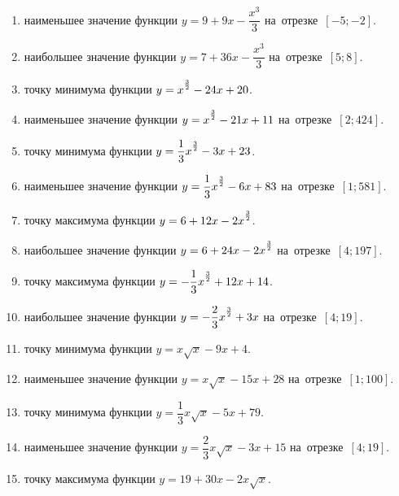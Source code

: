 \documentclass[a4paper,10pt]{article}
\begin{document}
\begin{enumerate}
\item {} наименьшее значение функции $y=9 +9x-\dfrac{x^3}{3}$ на~отрезке~$\left[-5;-2\right]$.

\item {} наибольшее значение функции $y=7 +36x-\dfrac{x^3}{3}$ на~отрезке~$\left[5;8\right]$.

\item {} точку минимума функции $y=x\strut^{\frac{3}{2}} -24x+20$.

\item {} наименьшее значение функции $y=x\strut^{\frac{3}{2}} -21x+11$ на~отрезке~$\left[2;424\right]$.

\item {} точку минимума функции $y=\dfrac{1}{3}x\strut^{\frac{3}{2}} -3x+23$.

\item {} наименьшее значение функции $y=\dfrac{1}{3}x\strut^{\frac{3}{2}} -6x+83$ на~отрезке~$\left[1;581\right]$.

\item {} точку максимума функции $y=6+12x-2x\strut^{\frac{3}{2}}$.

\item {} наибольшее значение функции $y=6+24x-2x\strut^{\frac{3}{2}}$ на~отрезке~$\left[4;197\right]$.

\item {} точку максимума функции $y=-\dfrac{1}{3}x\strut^{\frac{3}{2}} +12x+14$.

\item {} наибольшее значение функции $y=-\dfrac{2}{3}x\strut^{\frac{3}{2}} +3x$ на~отрезке~$\left[4;19\right]$.

\item {} точку минимума функции $y=x\sqrt{x} -9x+4$.

\item {} наименьшее значение функции $y=x\sqrt{x} -15x+28$ на~отрезке~$\left[1;100\right]$.

\item {} точку минимума функции $y=\dfrac{1}{3}x\sqrt{x} -5x+79$.

\item {} наименьшее значение функции $y=\dfrac{2}{3}x\sqrt{x} -3x+15$ на~отрезке~$\left[4;19\right]$.

\item {} точку максимума функции $y=19+30x -2x\sqrt{x}$.


\end{enumerate}
\end{document}
